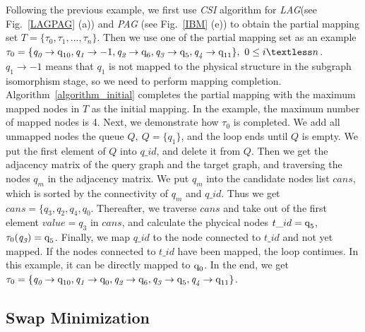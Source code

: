 \documentclass[runningheads]{llncs}
\begin{document}
	\begin{example}
		Following the previous example, we first use  \textit{CSI} algorithm for \textit{LAG}(see Fig.~\ref{LAGPAG} (a)) and \textit{PAG} (see Fig.~\ref{IBM} (e)) to obtain the partial mapping set $T=\{\tau_{0},\tau_{1},...,\tau_{n}\}$. Then we use one of the partial mapping set as an example
$\tau_{0}=\{\textit{q}_\textit{0}\rightarrow \textup{q}_{\textup{10}},\textit{q}_\textit{1}\rightarrow -1,
	\textit{q}_\textit{2}\rightarrow \textup{q}_{\textup{6}},\textit{q}_\textit{3}\rightarrow \textup{q}_{\textup{5}},\textit{q}_\textit{4}\rightarrow \textup{q}_{\textup{11}}\}, \ 0 \le i \textless n$. 
	$\textit{q}_\textit{1}\rightarrow -1$ means that $\textit{q}_\textit{1}$ is not mapped to the physical structure in the subgraph isomorphism stage,	so we need to perform mapping completion. Algorithm~\ref{algorithm_initial} completes the partial mapping with the maximum mapped nodes in $T$ as the initial mapping. In the example, the maximum number of mapped nodes is 4. Next, we demonstrate how $\tau_{0}$ is completed. We add all unmapped nodes the queue $Q, \ Q=\{\textit{q}_\textit{1}\}$, and the loop ends until $Q$ is empty. We put the first element of $Q$ into $q\_id$, and delete it from $Q$.  
	Then we get the adjacency matrix of the query graph and the target graph, and traversing the nodes $\textit{q}_\textit{m}$ in the adjacency matrix. We put $\textit{q}_\textit{m}$ into the candidate nodes list $cans$, which is sorted by the connectivity of $\textit{q}_\textit{m}$ and $q\_id$. Thus we get $cans=\{\textit{q}_\textit{3},\textit{q}_\textit{2},\textit{q}_\textit{4},\textit{q}_\textit{0}$.	Thereafter, we traverse $cans$ and take out of the first element $value=\textit{q}_\textit{3}$ in $cans$, and calculate the phycical nodes $t\_id=\textup{q}_{\textup{5}}$, $\tau_0(\textit{q}_\textit{3})=\textup{q}_{\textup{5}}$. Finally, we map $q\_id$ to the node connected to $t\_id$ and not yet mapped. If the nodes connected to $t\_id$ have been mapped, the loop continues. In this example, it can be directly mapped to $\textup{q}_{\textup{0}}$. In the end, we get $ \tau_{0}=\{\textit{q}_\textit{0}\rightarrow  \textup{q}_{10},\textit{q}_\textit{1}\rightarrow \textup{q}_{0},	\textit{q}_\textit{2}\rightarrow  \textup{q}_{\textup{6}},\textit{q}_\textit{3}\rightarrow  \textup{q}_{\textup{5}},\textit{q}_\textit{4}\rightarrow  \textup{q}_{\textup{11}}\}$.
	\end{example}
\subsection{Swap Minimization}
\end{document}
